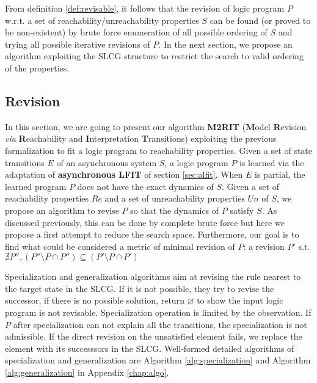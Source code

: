 From definition \ref{def:revisable}, it follows that the revision of logic program $P$ w.r.t. a set of reachability/unreachability properties $S$ can be found (or proved to be non-existent) by brute force enumeration of all possible ordering of $S$ and trying all possible iterative revisions of $P$.
In the next section, we propose an algorithm exploiting the SLCG structure to restrict the search to valid ordering of the properties.
\subsection{Revision}\label{sec:algorithm}

    In this section, we are going to present our algorithm \textbf{M2RIT} (\textbf{M}odel \textbf{R}evision \textit{via} \textbf{R}eachability and \textbf{I}nterpretation \textbf{T}ransitions) exploiting the previous formalization to fit a logic program to reachability properties.
    Given a set of state transitions $E$ of an asynchronous system $S$, a logic program $P$ is learned via the adaptation of \textbf{asynchronous LFIT} of section \ref{sec:alfit}.
    When $E$ is partial, the learned program $P$ does not have the exact dynamics of $S$.
    Given a set of reachability properties $Re$ and a set of unreachability properties $Un$ of $S$, we propose an algorithm to revise $P$ so that the dynamics of $P$ satisfy $S$.
    As discussed previously, this can be done by complete brute force but here we propose a first attempt to reduce the search space.
    Furthermore, our goal is to find what could be considered a metric of minimal revision of $P$:
    a revision $P'$ s.t. $\nexists P'', (P''\setminus P \cap P'')\subseteq (P' \setminus P \cap P')$
   
    Specialization and generalization algorithms aim at revising the rule nearest to the target state in the SLCG. 
    If it is not possible, they try to revise the successor, if there is no possible solution, return $\varnothing$ to show the input logic program is not revisable.
    Specialization operation is limited by the observation. If $P$ after specialization can not explain all the transitions, the specialization is not admissible.
    If the direct revision on the unsatisfied element fails, we replace the element with its successsors in the SLCG.
    Well-formed detailed algorithms of specialization and generalization are Algorithm \ref{alg:specialization} and Algorithm \ref{alg:generalization} in Appendix \ref{chap:algo}.
   

